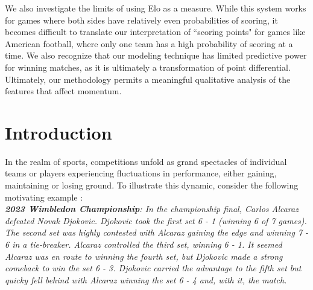 \documentclass[letterpaper, 12pt]{article}
\begin{document}
    We also investigate the limits of using Elo as a measure. While this system works for games where both sides have relatively even probabilities of scoring, it becomes difficult to translate our interpretation of ``scoring points" for games like American football, where only one team has a high probability of scoring at a time. We also recognize that our modeling technique has limited predictive power for winning matches, as it is ultimately a transformation of point differential. Ultimately, our methodology permits a meaningful qualitative analysis of the features that affect momentum.
    
    \clearpage
    \pagestyle{fancy}
    \rfoot{}    
    \cfoot{}
    \lfoot{}

    \maketitle

    \pagebreak
    \tableofcontents
    \setcounter{secnumdepth}{5}
    \setcounter{tocdepth}{5}

    \pagebreak
    \section{Introduction}

        In the realm of sports, competitions unfold as grand spectacles of individual teams or players experiencing fluctuations in performance, either gaining, maintaining or losing ground. To illustrate this dynamic, consider the following motivating example \cite{COMAP2024}: \\
        
        \noindent
        \textsl{\textbf{2023 Wimbledon Championship}: In the championship final, Carlos Alcaraz defeated Novak Djokovic. Djokovic took the first set 6 - 1 (winning 6 of 7 games). The second set was highly contested with Alcaraz gaining the edge and winning 7 - 6 in a tie-breaker. Alcaraz controlled the third set, winning 6 - 1. It seemed Alcaraz was en route to winning the fourth set, but Djokovic made a strong comeback to win the set 6 - 3. Djokovic carried the advantage to the fifth set but quicky fell behind with Alcaraz winning the set 6 - 4 and, with it, the match.} \\
\end{document}
